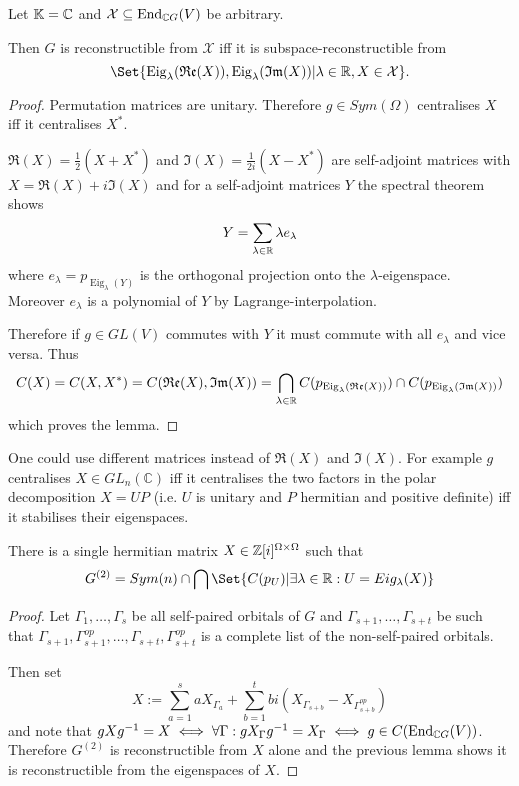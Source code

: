 \documentclass[fontsize=11pt,fleqn,a4paper]{scrartcl}
\begin{document}
\begin{lemma}
Let $\mathbb{K}=\mathbb{C}$ and $\mathcal{X}\subseteq\operatorname{End}_{\mathbb{C} G}(V)$ be arbitrary.

Then $G$ is reconstructible from $\mathcal{X}$ iff it is subspace-reconstructible from
\[\Set{\operatorname{Eig}_\lambda(\Re(X)),\operatorname{Eig}_\lambda(\Im(X)) | \lambda\in\IR, X\in\mathcal{X}}.\]
\end{lemma}
\begin{proof}
Permutation matrices are unitary. Therefore $g\in Sym(\Omega)$ centralises $X$ iff it centralises $X^\ast$.

$\Re(X) = \frac{1}{2}(X+X^\ast)$ and $\Im(X)=\frac{1}{2i}(X-X^\ast)$ are self-adjoint matrices with $X=\Re(X)+i\Im(X)$ and for a self-adjoint matrices $Y$ the spectral theorem shows
\[Y = \sum_{\lambda\in\mathbb{R}} \lambda e_\lambda\]
where $e_\lambda=p_{\operatorname{Eig}_\lambda(Y)}$ is the orthogonal projection onto the $\lambda$-eigenspace. Moreover $e_\lambda$ is a polynomial of $Y$ by Lagrange-interpolation.

Therefore if $g\in GL(V)$ commutes with $Y$ it must commute with all $e_\lambda$ and vice versa. Thus
\[C(X) = C(X,X^\ast) = C(\operatorname{\mathfrak{Re}}(X),\operatorname{\mathfrak{Im}}(X))=\bigcap_{\lambda\in\mathbb{R}} C(p_{\operatorname{Eig}_\lambda(\operatorname{\mathfrak{Re}}(X))}) \cap C(p_{\operatorname{Eig}_\lambda(\operatorname{\mathfrak{Im}}(X))})\]
which proves the lemma.
\end{proof}

\begin{remark}
One could use different matrices instead of $\Re(X)$ and $\Im(X)$. For example $g$ centralises $X\in GL_n(\mathbb{C})$ iff it centralises the two factors in the polar decomposition $X=UP$ (i.e. $U$ is unitary and $P$ hermitian and positive definite) iff it stabilises their eigenspaces.
\end{remark}

\begin{corollary}
There is a single hermitian matrix $X\in\mathbb{Z}[i]^{\Omega\times\Omega}$ such that
\[G^{(2)} = Sym(n) \cap\bigcap\Set{C(p_U) | \exists \lambda\in\IR: U=Eig_\lambda(X)}\]
\end{corollary}
\begin{proof}
Let $\Gamma_1,\ldots,\Gamma_s$ be all self-paired orbitals of $G$ and $\Gamma_{s+1}, \ldots,\Gamma_{s+t}$ be such that $\Gamma_{s+1}, \Gamma_{s+1}^{op}, \ldots,\Gamma_{s+t}, \Gamma_{s+t}^{op}$ is a complete list of the non-self-paired orbitals.

Then set
\[X := \sum_{a=1}^s aX_{\Gamma_a} + \sum_{b=1}^t bi(X_{\Gamma_{s+b}} -  X_{\Gamma_{s+b}^{op}})\]
and note that $gXg^{-1} = X \iff \forall \Gamma: gX_\Gamma g^{-1}=X_\Gamma \iff g\in C(\operatorname{End}_{\mathbb{C} G}(V))$. Therefore $G^{(2)}$ is reconstructible from $X$ alone and the previous lemma shows it is reconstructible from the eigenspaces of $X$.
\end{proof}
\end{document}
